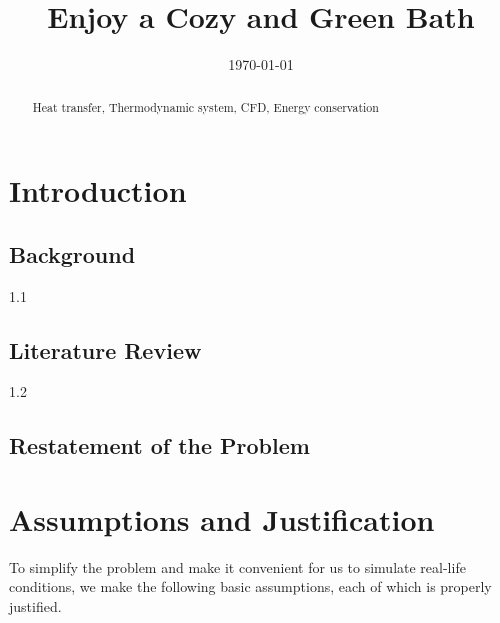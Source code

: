 \documentclass{mcmthesis}
\title{Enjoy a Cozy and Green Bath}
\date{\today}
\renewcommand{\contentsname}{\hspace*{\fill}\Large\bfseries Contents \hspace*{\fill}}
\begin{document}
\begin{abstract}

\begin{keywords}
Heat transfer, Thermodynamic system, CFD, Energy conservation
\end{keywords}

\end{abstract}

\maketitle

\tableofcontents        %
\thispagestyle{empty}

\newpage

\section{Introduction}

\subsection{Background}

1.1

\subsection{Literature Review}

1.2

\subsection{Restatement of the Problem}


\section{Assumptions and Justification}

To simplify the problem and make it convenient for us to simulate real-life conditions, we make the following basic assumptions, each of which is properly justified.

\begin{itemize}[leftmargin=*]
\end{itemize}
\end{document}
